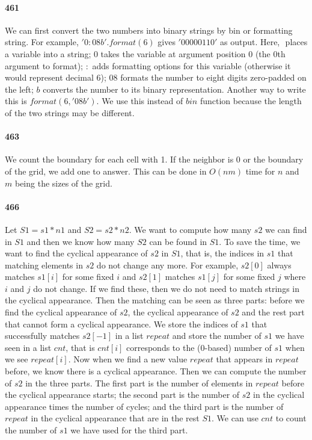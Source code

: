 \documentclass[11pt]{article}
\begin{document}
\begin{itemize}
\paragraph{461}
We can first convert the two numbers into binary strings by bin or formatting string. For example, $'{0:08b}'.format(6)$ gives 
$'00000110'$ as output. Here, ${}$ places a variable into a string; $0$ takes the variable at argument position 0 
(the 0th argument to format); 
$:$ adds formatting options for this variable (otherwise it would represent decimal 6); 
$08$ formats the number to eight digits zero-padded on the left;
$b$ converts the number to its binary representation.
Another way to write this is $format(6, '08b')$. We use this instead of $bin$ function because the length of the two strings 
may be different.

\paragraph{463}
We count the boundary for each cell with 1. If the neighbor is 0 or the boundary of the grid, we add one to answer.
This can be done in $O(nm)$ time for $n$ and $m$ being the sizes of the grid.

\paragraph{466}
Let $S1 = s1 * n1$ and $S2 = s2 * n2$. We want to compute how many $s2$ we can find in $S1$ and then we know how many $S2$ can 
be found in $S1$. To save the time, we want to find the cyclical appearance of $s2$ in $S1$, that is, the indices in $s1$ that 
matching elements in $s2$ do not change any more. For example, $s2[0]$ always matches $s1[i]$ for some fixed $i$ and $s2[1]$ 
matches $s1[j]$ for some fixed $j$ where $i$ and $j$ do not change.
If we find these, then we do not need to match strings in the cyclical appearance. Then the matching can be seen as three parts:
before we find the cyclical appearance of $s2$, the cyclical appearance of $s2$ and the rest part that cannot form a cyclical 
appearance. 
We store the indices of $s1$ that successfully matches $s2[-1]$ in a list $repeat$ and store the number of $s1$ we have seen in 
a list $cnt$, that is $cnt[i]$ corresponds to the (0-based) number of $s1$ when we see $repeat[i]$. 
Now when we find a new value $repeat$ that appears in $repeat$ before, we know there is a cyclical appearance. 
Then we can compute the number of $s2$ in the three parts. The first part is the number of elements in $repeat$ before the 
cyclical appearance starts; the second part is the number of $s2$ in the cyclical appearance times the number of cycles; and 
the third part is the number of $repeat$ in the cyclical appearance that are in the rest $S1$. 
We can use $cnt$ to count the number of $s1$ we have used for the third part.


\end{itemize}
\end{document}
